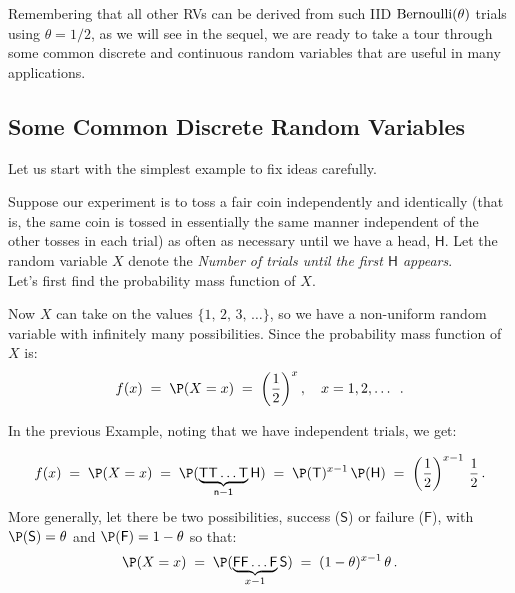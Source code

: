 Remembering that all other RVs can be derived from such IID $\mbox{{\rm Bernoulli}}(\theta)$ trials using $\theta=1/2$, as we will see in the sequel, 
we are ready to take a tour through some common discrete and continuous random variables that are useful in many applications.
 
\subsection{Some Common Discrete Random Variables}\label{S:SomeCommonDiscreteRVs}

Let us start with the simplest example to fix ideas carefully.
\begin{example}\label{Ex:WaitinfFor1stHeads}
Suppose our experiment is to toss a fair coin independently and
  identically (that is, the same coin is tossed in essentially the same
  manner independent of the other tosses in each trial) as often as
  necessary until we have a head, $\mathsf{H}$.  Let the random
  variable
  $X$ denote the \emph{Number of trials until the first $\mathsf{H}$ appears}.\\[4pt]
Let's first find the probability mass function of $X$.

Now $X$ can take on the values
$\{1,\,2,\,3,\,\ldots\}$, so we  have a  non-uniform random
variable with infinitely many possibilities.  Since
the  probability mass function of $X$ is:
$$f(x)\; =\; \P(X=x)\;=\;\left(\frac{1}{2}\right)^x, \quad x=1,2,\dots \enspace.$$
\end{example}

\bigskip

In the previous Example, %
noting that we have independent trials, we get:

\[f(x)\; = \;\P(X=x)\;=\;\P(\mathsf{\underbrace{\mathsf{TT}\ldots\mathsf{T}}_{n-1}\mathsf{H}})\;=\; \P(\mathsf{T})^{x-1}\,\P(\mathsf{H})\;=\;
\left(\frac{1}{2}\right)^{x-1}\,\frac{1}{2}\,.\]
More generally, let there be two possibilities, success ($\mathsf{S}$) or failure
($\mathsf{F}$), with  $\P(\mathsf{S})=  \theta$  and \newline $\P(\mathsf{F})=1-\theta$ so that:
\[\P(X=x)\;=\;\P(\underbrace{\mathsf{F F} \ldots \mathsf{F}}_{x-1}\mathsf{S})\;=\; (1 - \theta)^{x-1}\, \theta\,.\]


